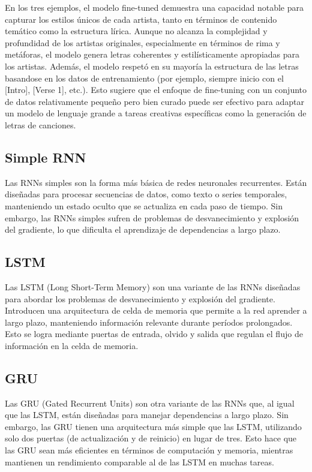 \documentclass[paper=letter, fontsize=11pt, draft=false]{scrartcl}
\numberwithin{equation}{section} %
\numberwithin{figure}{section} %
\numberwithin{table}{section} %
\numberwithin{subsection}{section}
\begin{document}
En los tres ejemplos, el modelo fine-tuned demuestra una capacidad notable para capturar los estilos únicos de cada artista, tanto en términos de contenido temático como la estructura lírica. Aunque no alcanza la complejidad y profundidad de los artistas originales, especialmente en términos de rima y metáforas, el modelo genera letras coherentes y estilísticamente apropiadas para los artistas. Además, el modelo respetó en su mayoría la estructura de las letras basandose en los datos de entrenamiento (por ejemplo, siempre inicio con el [Intro], [Verse 1], etc.). Esto sugiere que el enfoque de fine-tuning con un conjunto de datos relativamente pequeño pero bien curado puede ser efectivo para adaptar un modelo de lenguaje grande a tareas creativas específicas como la generación de letras de canciones.

\newpage
\subsection{Simple RNN}

Las RNNs simples son la forma más básica de redes neuronales recurrentes. Están diseñadas para procesar secuencias de datos, como texto o series temporales, manteniendo un estado oculto que se actualiza en cada paso de tiempo. Sin embargo, las RNNs simples sufren de problemas de desvanecimiento y explosión del gradiente, lo que dificulta el aprendizaje de dependencias a largo plazo.



\newpage
\subsection{LSTM}

Las LSTM (Long Short-Term Memory) son una variante de las RNNs diseñadas para abordar los problemas de desvanecimiento y explosión del gradiente. Introducen una arquitectura de celda de memoria que permite a la red aprender a largo plazo, manteniendo información relevante durante períodos prolongados. Esto se logra mediante puertas de entrada, olvido y salida que regulan el flujo de información en la celda de memoria.



\newpage
\subsection{GRU}
Las GRU (Gated Recurrent Units) son otra variante de las RNNs que, al igual que las LSTM, están diseñadas para manejar dependencias a largo plazo. Sin embargo, las GRU tienen una arquitectura más simple que las LSTM, utilizando solo dos puertas (de actualización y de reinicio) en lugar de tres. Esto hace que las GRU sean más eficientes en términos de computación y memoria, mientras mantienen un rendimiento comparable al de las LSTM en muchas tareas.


\newpage
\end{document}
